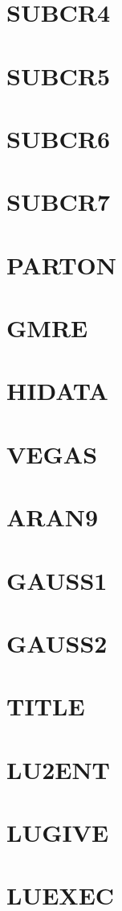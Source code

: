 \documentclass[10pt,UTF8]{ctexbook}
\begin{document}
\section{SUBCR4}
\section{SUBCR5}
\section{SUBCR6}
\section{SUBCR7}
\section{PARTON}
\section{GMRE}
\section{HIDATA}
\section{VEGAS}
\section{ARAN9}
\section{GAUSS1}
\section{GAUSS2}
\section{TITLE}
\section{LU2ENT}
\section{LUGIVE}
\section{LUEXEC}
\end{document}
